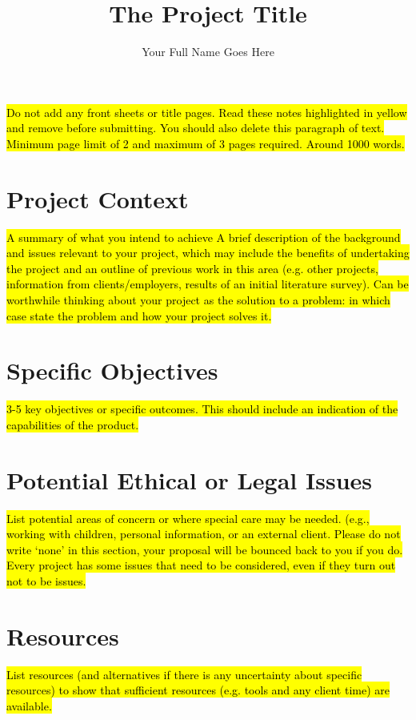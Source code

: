 \documentclass[a4paper,11pt]{proposal}
\author{Your Full Name Goes Here}
\title{The Project Title}
\begin{document}
\maketitle

\hl{Do not add any front sheets or title pages. Read these notes highlighted in yellow and remove before submitting. You should also delete this paragraph of text. Minimum page limit of 2 and maximum of 3 pages required. Around 1000 words.}

\section*{Project Context}

\hl{A summary of what you intend to achieve A brief description of the background and issues relevant to your project, which may include the benefits of undertaking the project and an outline of previous work in this area (e.g. other projects, information from clients/employers, results of an initial literature survey). Can be worthwhile thinking about your project as the solution to a problem: in which case state the problem and how your project solves it.}

\section*{Specific Objectives}

\hl{3-5 key objectives or specific outcomes.  This should include an indication of the capabilities of the product.}

\section*{Potential Ethical or Legal Issues}

\hl{List potential areas of concern or where special care may be needed. (e.g., working with children, personal information, or an external client. Please do not write ‘none’ in this section, your proposal will be bounced back to you if you do. Every project has some issues that need to be considered, even if they turn out not to be issues.}

\section*{Resources}

\hl{List resources (and alternatives if there is any uncertainty about specific resources) to show that sufficient resources (e.g. tools and any client time) are available.}
\end{document}
